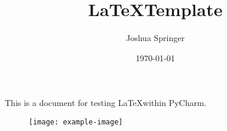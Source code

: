\documentclass[11pt]{article}
\author{Joshua Springer}
\title{\LaTeX Template}
\date{\specialdate\today}
\begin{document}
    \maketitle

    This is a document for testing \LaTeX within PyCharm.\cite{small}

    \begin{figure}
        \centering
        \texttt{[image: example-image]}
    \end{figure}
    

    
    
\end{document}
